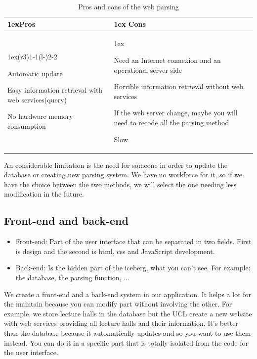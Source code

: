 \documentclass[11pt, a4paper]{report}
\begin{document}
\begin{table}[H]
\begin{tabularx}{\linewidth}{>{\parskip1ex}X@{\kern4\tabcolsep}>{\parskip1ex}X}
\toprule
\hfil\bfseries Pros
&
\hfil\bfseries Cons
\\\cmidrule(r{3\tabcolsep}){1-1}\cmidrule(l{-\tabcolsep}){2-2}

Automatic update\par
Easy information retrieval with web services(query)\par
No hardware memory consumption\par

&

Need an Internet connexion and an operational server side\par
Horrible information retrieval without web services\par
If the web server change, maybe you will need to recode all the parsing method\par
Slow\par


\\\bottomrule
\end{tabularx}
\caption{Pros and cons of the web parsing}
\end{table}


An considerable limitation is the need for someone in order to update the database or creating new parsing system. We have no workforce for it, so if we have the choice between the two methods, we will select the one needing less modification in the future.

\subsection{Front-end and back-end}

\begin{itemize}
\item Front-end: Part of the user interface that can be separated in two fields. First is design and the second is html, css and JavaScript development.
\item Back-end: Is the hidden part of the iceberg, what you can't see. For example: the database, the parsing function, ...
\end{itemize}

We create a front-end and a back-end system in our application. It helps a lot for the maintain because you can modify part without involving the other. For example, we store lecture halls in the database but the UCL create a new website with web services providing all lecture halls and their information. It's better than the database because it automatically updates and so you want to use them instead. You can do it in a specific part that is totally isolated from the code for the user interface.	
\end{document}
